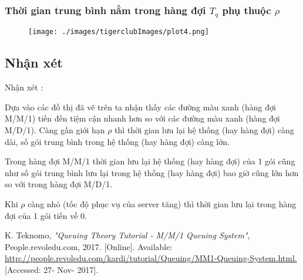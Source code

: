 \documentclass[a4paper]{article}
\begin{document}
\subsubsection*{Thời gian trung bình nằm trong hàng đợi $T_q$ phụ thuộc $\rho$}
\begin{figure}[H]
\centering
\texttt{[image: ./images/tigerclubImages/plot4.png]}
\end{figure}
\subsection{Nhận xét}
Nhận xét :
\par\noindent
Dựa vào các đồ thị đã vẽ trên ta nhận thấy các đường màu xanh (hàng đợi M/M/1) tiến đến
tiệm cận nhanh hơn so với các đường màu xanh (hàng đợi M/D/1). Càng gần giới hạn $\rho$ thì thời gian lưu lại hệ thống (hay hàng đợi) càng dài, số gói trung bình trong hệ thống (hay hàng đợi) càng lớn.
\par\noindent
Trong hàng đợi M/M/1 thời gian lưu lại hệ thống (hay hàng đợi) của 1 gói cũng như số
gói trung bình lưu lại trong hệ thống (hay hàng đợi) bao giờ cũng lớn hơn so với trong hàng đợi M/D/1.
\par\noindent
Khi $\rho$ càng nhỏ (tốc độ phục vụ của server tăng) thì thời gian lưu lại trong hàng đợi của 1
gói tiến về 0. 
\begin{thebibliography}{80}


K. Teknomo, {\em "Queuing Theory Tutorial - M/M/1 Queuing System"}, People.revoledu.com, 2017. [Online]. Available: \url{http://people.revoledu.com/kardi/tutorial/Queuing/MM1-Queuing-System.html.} [Accessed: 27- Nov- 2017].


\end{thebibliography}
\end{document}
